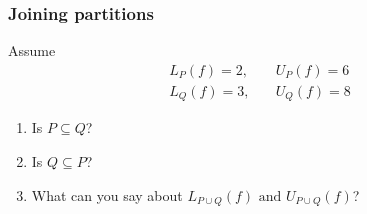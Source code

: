 \documentclass[14pt]{beamer}
\begin{document}
\begin{frame}[t]
	\frametitle{Joining partitions}

	Assume
	\begin{align*}
		L_{P}(f)=2, & \quad U_{P}(f)=6 \\
		L_{Q}(f)=3, & \quad U_{Q}(f)=8
	\end{align*}

	\begin{enumerate}
		\item Is $\displaystyle P \subseteq Q$?

		\item Is $\displaystyle Q \subseteq P$?

		\item What can you say about $\displaystyle L_{P \cup Q}(f) \text{ and }U_{P
			\cup Q}(f)$?
	\end{enumerate}
\end{frame}
\end{document}
